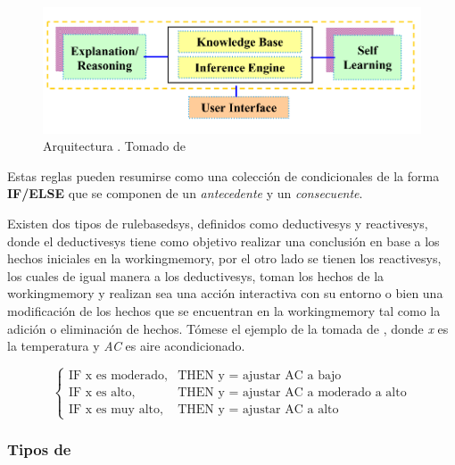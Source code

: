 \begin{figure}[H]
\centering
\includegraphics[scale=0.4]{Figures/kbs-architecture.png}
\decoRule
\caption[Arquitectura ]{Arquitectura . Tomado de \cite{sajja2010knowledge} }
\label{fig:kbs-arch}
\end{figure}

Estas reglas pueden resumirse como una colección de condicionales de la forma \textbf{IF/ELSE} que se componen de un \emph{antecedente} y un \emph{consecuente}.

Existen dos tipos de \gls{rulebasedsys}, definidos como \gls{deductivesys} y \gls{reactivesys}, donde el \gls{deductivesys} tiene como objetivo realizar una conclusión en base a los hechos iniciales en la \gls{workingmemory}, por el otro lado se tienen los \gls{reactivesys}, los cuales de igual manera a los \gls{deductivesys}, toman los hechos de la \gls{workingmemory} y realizan sea una acción interactiva con su entorno o bien una modificación de los hechos que se encuentran en la \gls{workingmemory} tal como la adición o eliminación de hechos. Tómese el ejemplo de la  tomada de \cite{Mendel}, donde \emph{x} es la temperatura y \emph{AC} es aire acondicionado.

\begin{equation} \label{eq:rbs-example}
  \left\{ \begin{array}{ll}
            \text{IF x es moderado,} & \text{THEN y = ajustar AC a bajo} \\
            \text{IF x es alto,}     & \text{THEN y = ajustar AC a moderado a alto} \\
            \text{IF x es muy alto,} & \text{THEN y = ajustar AC a alto} 
          \end{array} \right.
\end{equation}

\subsubsection{Tipos de } \label{ch:kbs-types}

